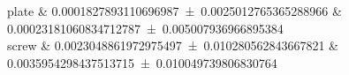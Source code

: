 plate 		&		\num{0.0001827893110696987 \pm 0.0025012765365288966} 		&		\num{0.00023181060834712787 \pm 0.005007936966895384}	 \\ 
screw 		&		\num{0.0023048861972975497 \pm 0.010280562843667821} 		&		\num{0.0035954298437513715 \pm 0.010049739806830764}	 \\ 
